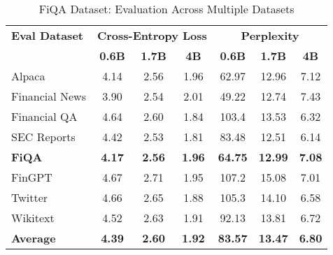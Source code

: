 
\begin{table}[h]
\centering
\caption[FiQA: Evaluation Results]{FiQA Dataset: Evaluation Across Multiple Datasets}
\label{tab:fiqa_results}
\begin{tabular}{l|ccc|ccc}
\hline
\textbf{Eval Dataset} & \multicolumn{3}{c|}{\textbf{Cross-Entropy Loss}} & \multicolumn{3}{c}{\textbf{Perplexity}} \\
\cline{2-4} \cline{5-7}
  & \textbf{0.6B} & \textbf{1.7B} & \textbf{4B} & \textbf{0.6B} & \textbf{1.7B} & \textbf{4B} \\
Alpaca & 4.14 & 2.56 & 1.96 & 62.97 & 12.96 & 7.12 \\
Financial News & 3.90 & 2.54 & 2.01 & 49.22 & 12.74 & 7.43 \\
Financial QA & 4.64 & 2.60 & 1.84 & 103.4 & 13.53 & 6.32 \\
SEC Reports & 4.42 & 2.53 & 1.81 & 83.48 & 12.51 & 6.14 \\
\textbf{FiQA} & \textbf{4.17} & \textbf{2.56} & \textbf{1.96} & \textbf{64.75} & \textbf{12.99} & \textbf{7.08} \\
FinGPT & 4.67 & 2.71 & 1.95 & 107.2 & 15.08 & 7.01 \\
Twitter & 4.66 & 2.65 & 1.88 & 105.3 & 14.10 & 6.58 \\
Wikitext & 4.52 & 2.63 & 1.91 & 92.13 & 13.81 & 6.72 \\
\hline
\textbf{Average} & \textbf{4.39} & \textbf{2.60} & \textbf{1.92} & \textbf{83.57} & \textbf{13.47} & \textbf{6.80} \\
\hline
\end{tabular}
\end{table}
